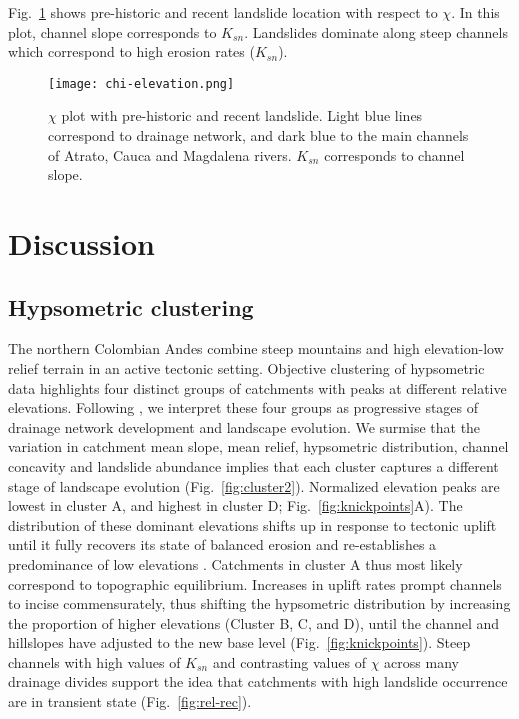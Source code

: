 \documentclass[draft]{agujournal2019}
\begin{document}
\par Fig.~\ref{fig:chi} shows pre-historic and recent landslide location with respect to $\chi$. In this plot, channel slope corresponds to $K_{sn}$. Landslides dominate along steep channels which correspond to high erosion rates ($K_{sn}$).

\begin{figure}[ht!]
    \centering
      {\texttt{[image: chi-elevation.png]}}
    \caption{$\chi$ plot with pre-historic and recent landslide. Light blue lines correspond to drainage network, and dark blue to the main channels of Atrato, Cauca and Magdalena rivers. $K_{sn}$ corresponds to channel slope.}
    \label{fig:chi}
\end{figure}


\section{Discussion}

\subsection{Hypsometric clustering}

\par The northern Colombian Andes combine steep mountains and high elevation-low relief terrain in an active tectonic setting. Objective clustering of hypsometric data highlights four distinct groups of catchments with peaks at different relative elevations. Following \cite{Gallen2011}, we interpret these four groups as progressive stages of drainage network development and landscape evolution. We surmise that the variation in catchment mean slope, mean relief, hypsometric distribution, channel concavity and landslide abundance implies that each cluster captures a different stage of landscape evolution (Fig.~\ref{fig:cluster2}). Normalized elevation peaks are lowest in cluster A, and highest in cluster D; Fig.~\ref{fig:knickpoints}A). The distribution of these dominant elevations shifts up in response to tectonic uplift until it fully recovers its state of balanced erosion and re-establishes a predominance of low elevations \cite{Gallen2011}. Catchments in cluster A thus most likely correspond to topographic equilibrium. Increases in uplift rates prompt channels to incise commensurately, thus shifting the hypsometric distribution by increasing the proportion of higher elevations (Cluster B, C, and D), until the channel and hillslopes have adjusted to the new base level (Fig.~\ref{fig:knickpoints}). Steep channels with high values of $K_{sn}$ and contrasting values of $\chi$ across many drainage divides support the idea that catchments with high landslide occurrence are in transient state (Fig.~\ref{fig:rel-rec}).
\end{document}
